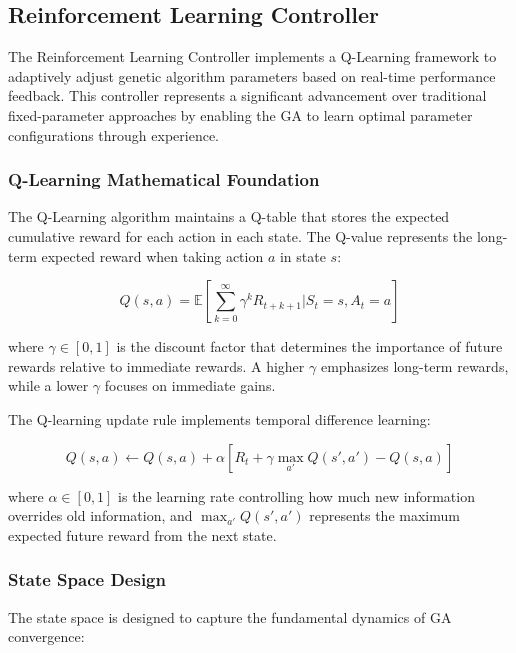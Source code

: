 \documentclass[12pt,a4paper]{article}
\begin{document}
\subsection{Reinforcement Learning Controller}

The Reinforcement Learning Controller implements a Q-Learning framework to adaptively adjust genetic algorithm parameters based on real-time performance feedback. This controller represents a significant advancement over traditional fixed-parameter approaches by enabling the GA to learn optimal parameter configurations through experience.

\subsubsection{Q-Learning Mathematical Foundation}

The Q-Learning algorithm maintains a Q-table that stores the expected cumulative reward for each action in each state. The Q-value represents the long-term expected reward when taking action $a$ in state $s$:

\begin{equation}\label{Eq.q_table_definition}
Q(s, a) = \mathbb{E}\left[\sum_{k=0}^{\infty} \gamma^k R_{t+k+1} | S_t = s, A_t = a\right]
\end{equation}

where $\gamma \in [0,1]$ is the discount factor that determines the importance of future rewards relative to immediate rewards. A higher $\gamma$ emphasizes long-term rewards, while a lower $\gamma$ focuses on immediate gains.

The Q-learning update rule implements temporal difference learning:

\begin{equation}\label{Eq.q_learning_update}
Q(s, a) \leftarrow Q(s, a) + \alpha \left[ R_t + \gamma \max_{a'} Q(s', a') - Q(s, a) \right]
\end{equation}

where $\alpha \in [0,1]$ is the learning rate controlling how much new information overrides old information, and $\max_{a'} Q(s', a')$ represents the maximum expected future reward from the next state.

\subsubsection{State Space Design}

The state space is designed to capture the fundamental dynamics of GA convergence:
\end{document}
